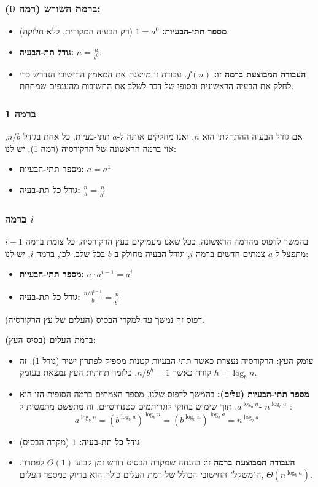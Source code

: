 \documentclass[11pt, a4paper]{article}
\begin{document}
\subsubsection*{ברמת השורש (רמה 0):}
\begin{itemize}
    \item \textbf{מספר תתי-הבעיות:} $1 = a^0$ (רק הבעיה המקורית, ללא חלוקה).
    \item \textbf{גודל תת-הבעיה:} $n = \frac{n}{b^0}$.
    \item \textbf{העבודה המבוצעת ברמה זו:} $f(n)$. עבודה זו מייצגת את המאמץ החישובי הנדרש כדי לחלק את הבעיה הראשונית ובסופו של דבר לשלב את התשובות מהענפים שמתחת.
\end{itemize}

\subsubsection*{ברמה 1}
אם גודל הבעיה ההתחלתי הוא $n$, ואנו מחלקים אותה ל-$a$ תתי-בעיות, כל אחת בגודל $n/b$, אזי ברמה הראשונה של הרקורסיה (רמה 1), יש לנו:
\begin{itemize}
    \item \textbf{מספר תתי-הבעיות:} $a = a^1$
    \item \textbf{גודל כל תת-בעיה:} $\frac{n}{b} = \frac{n}{b^1}$
\end{itemize}

\subsubsection*{ברמה $i$}
בהמשך לדפוס מהרמה הראשונה, ככל שאנו מעמיקים בעץ הרקורסיה, כל צומת ברמה $i-1$ מתפצל ל-$a$ צמתים חדשים ברמה $i$, וגודל הבעיה מחולק ב-$b$ בכל שלב. לכן, ברמה $i$, יש לנו:
\begin{itemize}
    \item \textbf{מספר תתי-הבעיות:} $a \cdot a^{i-1} = a^i$
    \item \textbf{גודל כל תת-בעיה:} $\frac{n/b^{i-1}}{b} = \frac{n}{b^i}$
\end{itemize}

דפוס זה נמשך עד למקרי הבסיס (העלים של עץ הרקורסיה).


\vspace{0.5cm}
\noindent\textbf{ברמת העלים (בסיס העץ):}
\begin{itemize}
    \item \textbf{עומק העץ:} הרקורסיה נעצרת כאשר תתי-הבעיות קטנות מספיק לפתרון ישיר (גודל 1). זה קורה כאשר $n/b^h= 1$, כלומר תחתית העץ נמצאת בעומק $h = \log_b n$.
    \item \textbf{מספר תתי-הבעיות (עלים):} בהמשך לדפוס שלנו, מספר הצמתים ברמה הסופית הזו הוא $a^{\log_b n}$. תוך שימוש בחוקי לוגריתמים סטנדרטיים, זה מתפשט מתמטית ל- $n^{\log_b a}$ :
        \[ a^{\log_b n} = (b^{\log_b a})^{\log_b n} = (b^{\log_b n})^{\log_b a} = n^{\log_b a} \]
    \item \textbf{גודל כל תת-בעיה:} $1$ (מקרה הבסיס).
    \item \textbf{העבודה המבוצעת ברמה זו:} בהנחה שמקרה הבסיס דורש זמן קבוע $\Theta(1)$ לפתרון, ה"משקל" החישובי הכולל של רמת העלים כולה הוא בדיוק כמספר העלים, $\Theta(n^{\log_b a})$.
\end{itemize}
\end{document}
